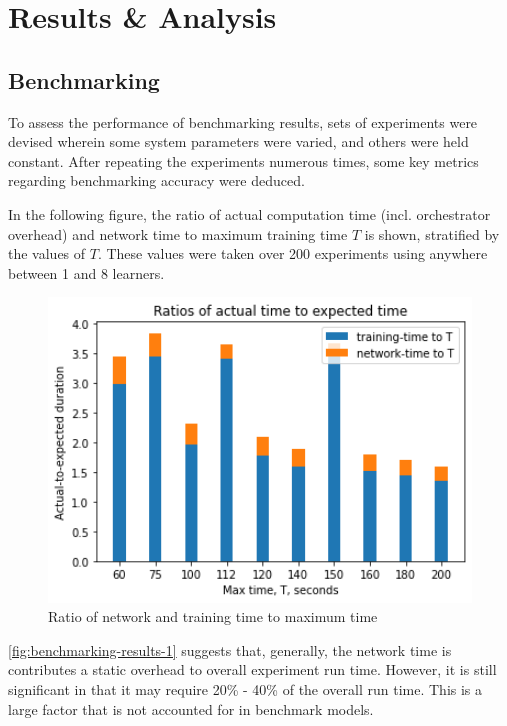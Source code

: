 \documentclass[../mthe-493-final-project.tex]{subfiles}
\begin{document}
    \chapter{Results \& Analysis}
    \label{ch:results-and-analysis}
    
    \section{Benchmarking}
    \label{sec:benchmarking-results}
    
    To assess the performance of benchmarking results, sets of experiments were devised wherein some system parameters were varied, and others were held constant. After repeating the experiments numerous times, some key metrics regarding benchmarking accuracy were deduced.
    
    In the following figure, the ratio of actual computation time (incl. orchestrator overhead) and network time to maximum training time $T$ is shown, stratified by the values of $T$. These values were taken over 200 experiments using anywhere between 1 and 8 learners.
    
    \begin{figure}
        \centering
        \includegraphics[width=120mm,scale=0.5]{thesis/img/benchmarking-error-by-max-time.png}
        \caption{Ratio of network and training time to maximum time}
        \label{fig:benchmarking-results-1}
    \end{figure}
    
    \autoref{fig:benchmarking-results-1} suggests that, generally, the network time is contributes a static overhead to overall experiment run time. However, it is still significant in that it may require 20\% - 40\% of the overall run time. This is a large factor that is not accounted for in benchmark models.
    
\end{document}
